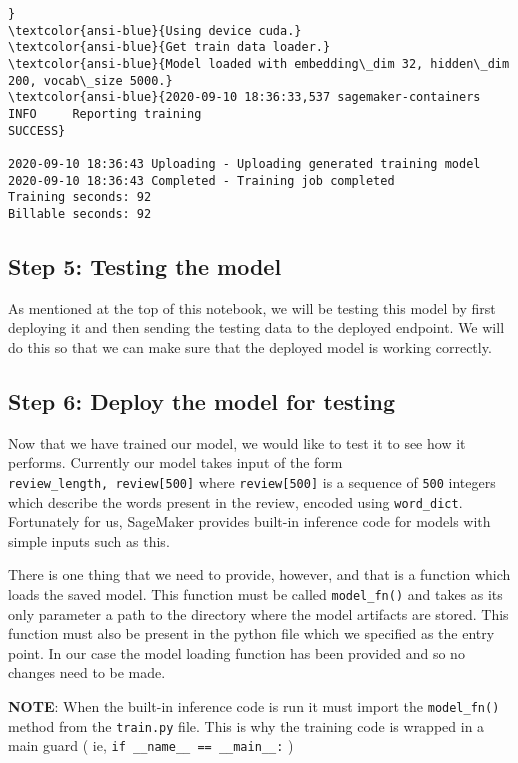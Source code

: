 \documentclass[11pt]{article}
\begin{document}
\begin{Verbatim}[commandchars=\\\{\}]
}
\textcolor{ansi-blue}{Using device cuda.}
\textcolor{ansi-blue}{Get train data loader.}
\textcolor{ansi-blue}{Model loaded with embedding\_dim 32, hidden\_dim 200, vocab\_size 5000.}
\textcolor{ansi-blue}{2020-09-10 18:36:33,537 sagemaker-containers INFO     Reporting training
SUCCESS}

2020-09-10 18:36:43 Uploading - Uploading generated training model
2020-09-10 18:36:43 Completed - Training job completed
Training seconds: 92
Billable seconds: 92
    \end{Verbatim}

    \hypertarget{step-5-testing-the-model}{%
\subsection{Step 5: Testing the model}\label{step-5-testing-the-model}}

As mentioned at the top of this notebook, we will be testing this model
by first deploying it and then sending the testing data to the deployed
endpoint. We will do this so that we can make sure that the deployed
model is working correctly.

\hypertarget{step-6-deploy-the-model-for-testing}{%
\subsection{Step 6: Deploy the model for
testing}\label{step-6-deploy-the-model-for-testing}}

Now that we have trained our model, we would like to test it to see how
it performs. Currently our model takes input of the form
\texttt{review\_length,\ review{[}500{]}} where \texttt{review{[}500{]}}
is a sequence of \texttt{500} integers which describe the words present
in the review, encoded using \texttt{word\_dict}. Fortunately for us,
SageMaker provides built-in inference code for models with simple inputs
such as this.

There is one thing that we need to provide, however, and that is a
function which loads the saved model. This function must be called
\texttt{model\_fn()} and takes as its only parameter a path to the
directory where the model artifacts are stored. This function must also
be present in the python file which we specified as the entry point. In
our case the model loading function has been provided and so no changes
need to be made.

\textbf{NOTE}: When the built-in inference code is run it must import
the \texttt{model\_fn()} method from the \texttt{train.py} file. This is
why the training code is wrapped in a main guard ( ie,
\texttt{if\ \_\_name\_\_\ ==\ \textquotesingle{}\_\_main\_\_\textquotesingle{}:}
)
\end{document}
